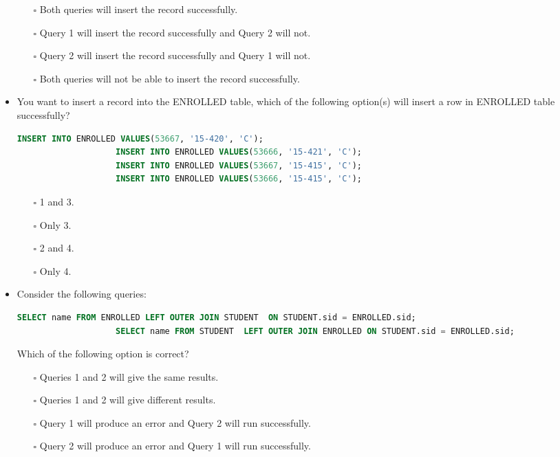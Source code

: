 \documentclass[10pt]{article}
\begin{document}
\begin{itemize}
				\begin{enumerate}
					\item[$\square$] Both queries will insert the record successfully.
					\item[$\square$] Query 1 will insert the record successfully and Query 2 will not.
					\item[$\square$] Query 2 will insert the record successfully and Query 1 will not.
					\item[$\square$] Both queries will not be able to insert the record successfully.
				\end{enumerate}

			\item You want to insert a record into the ENROLLED table, which of the following option(s) will insert a row in ENROLLED table successfully?
				\begin{lstlisting}[language=SQL,firstline=1, lastline=4] 
					INSERT INTO ENROLLED VALUES(53667, '15-420', 'C');
					INSERT INTO ENROLLED VALUES(53666, '15-421', 'C');
					INSERT INTO ENROLLED VALUES(53667, '15-415', 'C');
					INSERT INTO ENROLLED VALUES(53666, '15-415', 'C');
				\end{lstlisting}

				\begin{enumerate}
					\item[$\square$] 1 and 3.
					\item[$\square$] Only 3.
					\item[$\square$] 2 and 4.
					\item[$\square$] Only 4.
				\end{enumerate}
			
			\item Consider the following queries:
				\begin{lstlisting}[language=SQL,firstline=1, lastline=2] 
					SELECT name FROM ENROLLED LEFT OUTER JOIN STUDENT  ON STUDENT.sid = ENROLLED.sid;
					SELECT name FROM STUDENT  LEFT OUTER JOIN ENROLLED ON STUDENT.sid = ENROLLED.sid;
				\end{lstlisting}
				Which of the following option is correct?
				\begin{enumerate}
					\item[$\square$] Queries 1 and 2 will give the same results.
					\item[$\square$] Queries 1 and 2 will give different results.
					\item[$\square$] Query 1 will produce an error and Query 2 will run successfully.
					\item[$\square$] Query 2 will produce an error and Query 1 will run successfully.
				\end{enumerate}


\end{itemize}
\end{document}
